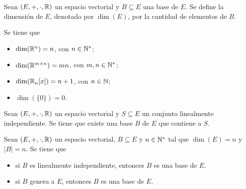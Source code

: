 \documentclass[a4,11pt]{aleph-notas}
\begin{document}
\begin{defi}[Dimensión]
    Sean $(E,+,\cdot,\R)$ un espacio vectorial y $B\subseteq E$ una base de $E$. Se define la dimensión de $E$, denotado por $\dim(E)$, por la cantidad de elementos de $B$.
\end{defi}

\begin{teo}
    Se tiene que
    \begin{itemize}
    \item
        $\dim(\R^n)=n$, con $n\in \N^*$;
    \item
        $\dim(\Mat[\R]{m}{n})=mn$, con $m,n\in \N^*$;
    \item
        $\dim(\R_n[x])=n+1$, con $n\in \N$;
    \item
        $\dim(\{0\}) = 0$.
    \end{itemize}
\end{teo}


\begin{teo}
    Sean $(E,+,\cdot,\R)$ un espacio vectorial y $S\subseteq E$ un conjunto linealmente independiente. Se tiene que existe una base $B$ de $E$ que contiene a $S$.
\end{teo}


\begin{teo}
    Sean $(E,+,\cdot,\R)$ un espacio vectorial, $B\subseteq E$ y $n\in\N^*$ tal que $\dim(E)=n$ y $|B|=n$. Se tiene que
    \begin{itemize}
    \item
        si $B$ es linealmente independiente, entonces $B$ es una base de $E$.
    \item
        si $B$ genera a $E$, entonces $B$ es una base de $E$.
    \end{itemize}
\end{teo}
\end{document}
